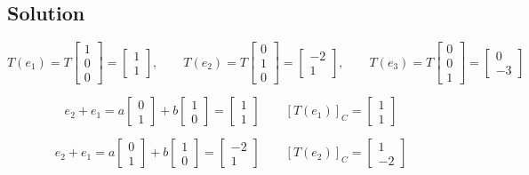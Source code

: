 \subsection*{Solution}
$$T(e_1) = T\begin{bmatrix}
    1\\0\\0
\end{bmatrix} = \begin{bmatrix}
    1\\1
\end{bmatrix}, \qquad T(e_2) = T\begin{bmatrix}
    0\\1\\0
\end{bmatrix} = \begin{bmatrix}
    -2\\1
\end{bmatrix}, \qquad T(e_3) = T\begin{bmatrix}
    0\\0\\1
\end{bmatrix} = \begin{bmatrix}
    0\\-3
\end{bmatrix}$$

$$e_2+e_1 = a\begin{bmatrix}
    0\\1
\end{bmatrix} + b\begin{bmatrix}
    1\\0
\end{bmatrix} = \begin{bmatrix}
    1\\1
\end{bmatrix}\qquad [T(e_1)]_C = \begin{bmatrix}
    1\\1
\end{bmatrix}$$

$$e_2+e_1 = a\begin{bmatrix}
    0\\1
\end{bmatrix} + b\begin{bmatrix}
    1\\0
\end{bmatrix} = \begin{bmatrix}
    -2\\1
\end{bmatrix}\qquad [T(e_2)]_C = \begin{bmatrix}
    1\\-2
\end{bmatrix}$$

